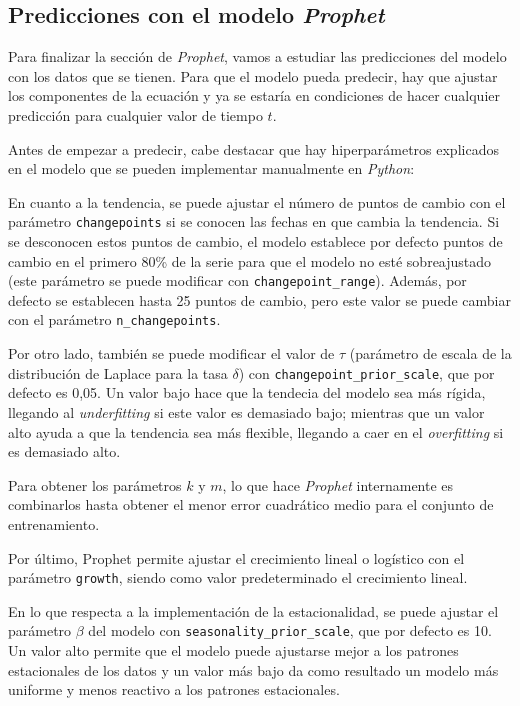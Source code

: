 \documentclass[12pt,twoside]{article}
\begin{document}
\subsection{Predicciones con el modelo \textit{Prophet}}\label{sec:7}

Para finalizar la sección de \textit{Prophet}, vamos a estudiar las predicciones del modelo con los datos que se tienen. Para que el modelo pueda predecir, hay que ajustar los componentes de la ecuación y ya se estaría en condiciones de hacer cualquier predicción para cualquier valor de tiempo $t$.

Antes de empezar a predecir, cabe destacar que hay hiperparámetros \cite{prophet2} explicados en el modelo que se pueden implementar manualmente en \textit{Python}:

En cuanto a la tendencia, se puede ajustar el número de puntos de cambio con el parámetro \texttt{changepoints} si se conocen las fechas en que cambia la tendencia. Si se desconocen estos puntos de cambio, el modelo establece por defecto puntos de cambio en el primero 80\% de la serie para que el modelo no esté sobreajustado (este parámetro se puede modificar con \texttt{changepoint\_range}). Además, por defecto se establecen hasta 25 puntos de cambio, pero este valor se puede cambiar con el parámetro \texttt{n\_changepoints}.

Por otro lado, también se puede modificar el valor de $\tau$ (parámetro de escala de la distribución de Laplace para la tasa $\delta$) con \texttt{changepoint\_prior\_scale}, que por defecto es 0,05. Un valor bajo hace que la tendecia del modelo sea más rígida, llegando al \textit{underfitting} si este valor es demasiado bajo; mientras que un valor alto ayuda a que la tendencia sea más flexible, llegando a caer en el \textit{overfitting} si es demasiado alto.

Para obtener los parámetros $k$ y $m$, lo que hace \textit{Prophet} internamente es combinarlos hasta obtener el menor error cuadrático medio para el conjunto de entrenamiento.

Por último, Prophet permite ajustar el crecimiento lineal o logístico con el parámetro \texttt{growth}, siendo como valor predeterminado el crecimiento lineal.

En lo que respecta a la implementación de la estacionalidad, se puede ajustar el parámetro $\beta$ del modelo con \texttt{seasonality\_prior\_scale}, que por defecto es 10. Un valor alto permite que el modelo puede ajustarse mejor a los patrones estacionales de los datos y un valor más bajo da como resultado un modelo más uniforme y menos reactivo a los patrones estacionales.
\end{document}
